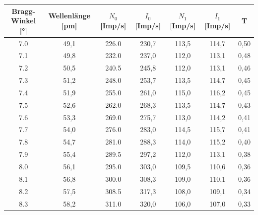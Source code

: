 \documentclass[titlepage = firstcover]{scrartcl}
\begin{document}
\begin{table}[h]
        \begin{tabular}{c c c c c c c}
            \toprule
            {Bragg-Winkel [°]}  & {Wellenlänge [pm]} & {$N_0$ [Imp/s]} & {$I_0$ [Imp/s]} & {$N_1$ [Imp/s]} & {$I_1$ [Imp/s]} & {T} \\ 
            \midrule
            7.0	                &  49,1              &  226.0          &    230,7       &    113,5        &    114,7       &  0,50 \\
            7.1	                &  49,8              &  232.0          &    237,0       &    112,0        &    113,1       &  0,48 \\
            7.2	                &  50,5              &  240.5          &    245,8       &    112,0        &    113,1       &  0,46 \\
            7.3	                &  51,2              &  248.0          &    253,7       &    113,5        &    114,7       &  0,45 \\
            7.4	                &  51,9              &  255.0          &    261,0       &    115,0        &    116,2       &  0,45 \\
            7.5	                &  52,6              &  262.0          &    268,3       &    113,5        &    114,7       &  0,43 \\
            7.6	                &  53,3              &  269.0          &    275,7       &    113,0        &    114,2       &  0,41 \\
            7.7	                &  54,0              &  276.0          &    283,0       &    114,5        &    115,7       &  0,41 \\
            7.8	                &  54,7              &  281.0          &    288,3       &    114,0        &    115,2       &  0,40 \\
            7.9	                &  55,4              &  289.5          &    297,2       &    112,0        &    113,1       &  0,38 \\
            8.0	                &  56,1              &  295.0          &    303,0       &    109,5        &    110,6       &  0,36 \\
            8.1	                &  56,8              &  300.0          &    308,3       &    109,0        &    110,1       &  0,36 \\
            8.2	                &  57,5              &  308.5          &    317,3       &    108,0        &    109,1       &  0,34 \\
            8.3	                &  58,2              &  311.0          &    320,0       &    106,0        &    107,0       &  0,33 \\

\end{tabular}
\end{table}
\end{document}
